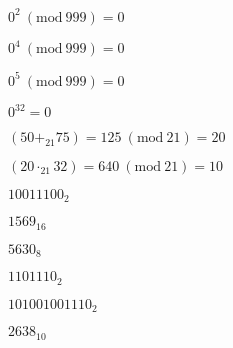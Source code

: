 \documentclass{exam}
\newcommand{\Mod}[1]{\ (\mathrm{mod}\ #1)}
\begin{document}
\begin{questions}
\begin{subparts}
\begin{center}
\(0^2 \Mod{999} = 0\)

\(0^4 \Mod{999} = 0\)

\(0^5 \Mod{999} = 0\)

\(0^{32} = 0\)

\end{center}


\begin{center}

\( (50 +_{21} 75) = 125 \Mod{21} = 20\)

\( (20 \cdot_{21} 32) = 640 \Mod{21} = 10\)

\end{center}

\end{subparts}

\begin{subparts}

\begin{center} \(1001 1100_2\) \end{center}


\begin{center} \(1569_{16}\) \end{center}


\begin{center} \(5630_{8}\) \end{center}


\begin{center} \(110 1110_{2}\) \end{center}


\begin{center} \(1010 0100 1110_{2}\) \end{center}


\begin{center} \(2638_{10}\) \end{center}



\end{subparts}
\end{questions}
\end{document}
